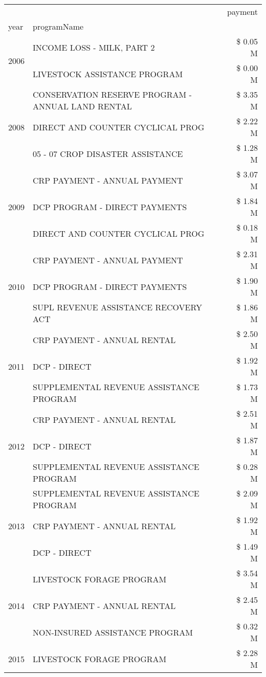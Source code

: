 \begin{tabular}{llr}
\toprule
 &  & payment \\
year & programName &  \\
\midrule
\multirow[t]{2}{*}{2006} & INCOME LOSS - MILK, PART 2 & \$ 0.05 M \\
 & LIVESTOCK ASSISTANCE PROGRAM & \$ 0.00 M \\
\cline{1-3}
\multirow[t]{3}{*}{2008} & CONSERVATION RESERVE PROGRAM - ANNUAL LAND RENTAL & \$ 3.35 M \\
 & DIRECT AND COUNTER CYCLICAL PROG & \$ 2.22 M \\
 & 05 - 07 CROP DISASTER ASSISTANCE & \$ 1.28 M \\
\cline{1-3}
\multirow[t]{3}{*}{2009} & CRP PAYMENT - ANNUAL PAYMENT & \$ 3.07 M \\
 & DCP PROGRAM - DIRECT PAYMENTS & \$ 1.84 M \\
 & DIRECT AND COUNTER CYCLICAL PROG & \$ 0.18 M \\
\cline{1-3}
\multirow[t]{3}{*}{2010} & CRP PAYMENT - ANNUAL PAYMENT & \$ 2.31 M \\
 & DCP PROGRAM - DIRECT PAYMENTS & \$ 1.90 M \\
 & SUPL REVENUE ASSISTANCE RECOVERY ACT & \$ 1.86 M \\
\cline{1-3}
\multirow[t]{3}{*}{2011} & CRP PAYMENT - ANNUAL RENTAL & \$ 2.50 M \\
 & DCP - DIRECT & \$ 1.92 M \\
 & SUPPLEMENTAL REVENUE ASSISTANCE PROGRAM & \$ 1.73 M \\
\cline{1-3}
\multirow[t]{3}{*}{2012} & CRP PAYMENT - ANNUAL RENTAL & \$ 2.51 M \\
 & DCP - DIRECT & \$ 1.87 M \\
 & SUPPLEMENTAL REVENUE ASSISTANCE PROGRAM & \$ 0.28 M \\
\cline{1-3}
\multirow[t]{3}{*}{2013} & SUPPLEMENTAL REVENUE ASSISTANCE PROGRAM & \$ 2.09 M \\
 & CRP PAYMENT - ANNUAL RENTAL & \$ 1.92 M \\
 & DCP - DIRECT & \$ 1.49 M \\
\cline{1-3}
\multirow[t]{3}{*}{2014} & LIVESTOCK FORAGE PROGRAM & \$ 3.54 M \\
 & CRP PAYMENT - ANNUAL RENTAL & \$ 2.45 M \\
 & NON-INSURED ASSISTANCE PROGRAM & \$ 0.32 M \\
\cline{1-3}
\multirow[t]{3}{*}{2015} & LIVESTOCK FORAGE PROGRAM & \$ 2.28 M \\

\end{tabular}
